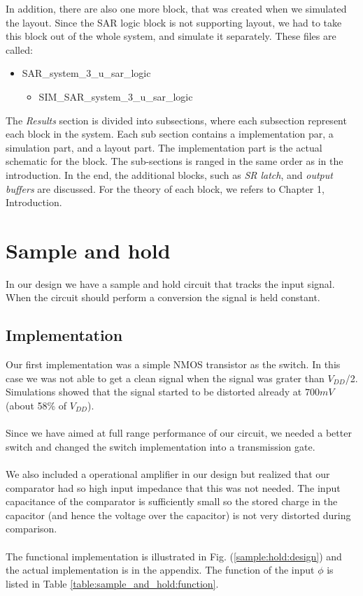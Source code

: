 \documentclass[english, 12pt, a4paper]{ifimaster}
\begin{document}
In addition, there are also one more block, that was created when we simulated the layout. Since the SAR logic block is not supporting layout, we had to take this block out of the whole system, 
and simulate it separately. These files are called:
\begin{itemize}
 \item SAR\_system\_3\_u\_sar\_logic
 \begin{itemize}
  \item SIM\_SAR\_system\_3\_u\_sar\_logic
 \end{itemize}
\end{itemize}
The \textit{Results} section is divided into subsections, where each subsection represent each block in the system. Each sub section contains a implementation par, a simulation part, and a layout part. 
The implementation part is the actual schematic for the block. The sub-sections is ranged in the same order as in the introduction. In the end, the additional blocks, such as \textit{SR latch}, and 
\textit{output buffers} are discussed. For the theory of each block, we refers to Chapter 1, Introduction. 

\section{Sample and hold}
In our design we have a sample and hold circuit that tracks the input signal. When the circuit should perform a conversion the signal is held constant.

\subsection{Implementation}
Our first implementation was a simple NMOS transistor as the switch. In this case we was not able to get a clean signal when the signal was grater than \(V_{DD}\)/2. 
Simulations showed that the signal started to be distorted already at \(700 mV\) (about 58\% of \(V_{DD}\)).\\
\\
Since we have aimed at full range performance of our circuit, we needed a better switch and changed the switch implementation into a transmission gate. \\
\\
We also included a operational amplifier in our design but realized that our comparator had so high input impedance that this was not needed. The input capacitance of the 
comparator is sufficiently small so the stored charge in the capacitor (and hence the voltage over the capacitor) is not very distorted during comparison.\\
\\
The functional implementation is illustrated in Fig. (\ref{sample:hold:design}) and the actual implementation is in the appendix. 
The function of the input \(\phi\) is listed in Table \ref{table:sample_and_hold:function}.
\end{document}
